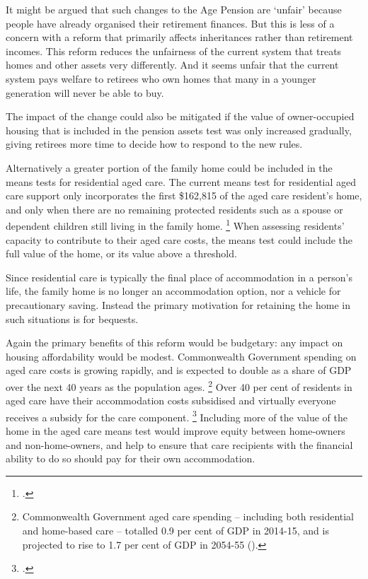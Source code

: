 It might be argued that such changes to the Age Pension are `unfair' because people have already organised their retirement finances.
But this is less of a concern with a reform that primarily affects inheritances rather than retirement incomes.
This reform reduces the unfairness of the current system that treats homes and other assets very differently.
And it seems unfair that the current system pays welfare to retirees who own homes that many in a younger generation will never be able to buy.

The impact of the change could also be mitigated if the value of owner-occupied housing that is included in the pension assets test was only increased gradually, giving retirees more time to decide how to respond to the new rules.

Alternatively a greater portion of the family home could be included in the means tests for residential aged care.
The current means test for residential aged care support only incorporates the first \$162,815 of the aged care resident’s home, and only when there are no remaining protected residents such as a spouse or dependent children still living in the family home.%
    \footcite[][22]{PC-2015-Housing-decisions-elderly}
When assessing residents' capacity to contribute to their aged care costs, the means test could include the full value of the home, or its value above a threshold.

Since residential care is typically the final place of accommodation in a person’s life, the family home is no longer an accommodation option, nor a vehicle for precautionary saving. Instead the primary motivation for retaining the home in such situations is for bequests. 

Again the primary benefits of this reform would be budgetary: any impact on housing affordability would be modest. Commonwealth Government spending on aged care costs is growing rapidly, and is expected to double as a share of GDP over the next 40 years as the population ages.%
    \footnote{Commonwealth Government aged care spending -- including both residential and home-based care -- totalled 0.9 per cent of GDP in 2014-15, and is projected to rise to 1.7 per cent of GDP in 2054-55 (\textcite{Hockey2015IGR}).} 
Over 40 per cent of residents in aged care have their accommodation costs subsidised and virtually everyone receives a subsidy for the care component.%
    \footcite[][22]{PC-2015-Housing-decisions-elderly} 
Including more of the value of the home in the aged care means test would improve equity between home-owners and non-home-owners, and help to ensure that care recipients with the financial ability to do so should pay for their own accommodation. 



